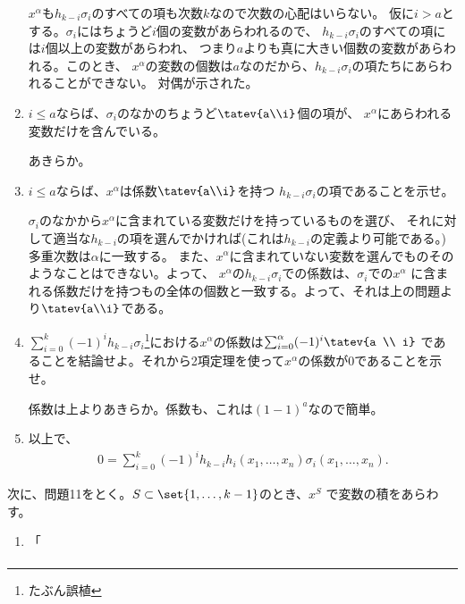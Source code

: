 \begin{myproof}
\begin{enumerate}[label=(\alph*)]
    $x^\alpha$も$h_{k-i}\sigma_i$のすべての項も次数$k$なので次数の心配はいらない。
    仮に$i>a$とする。$\sigma_i$にはちょうど$i$個の変数があらわれるので、
    $h_{k-i}\sigma_i$のすべての項には$i$個以上の変数があらわれ、
    つまり$a$よりも真に大きい個数の変数があらわれる。このとき、
    $x^\alpha$の変数の個数は$a$なのだから、$h_{k-i}\sigma_i$の項たちにあらわれることができない。
    対偶が示された。
    \item
    \begin{framed}
      $i\le a$ならば、$\sigma_i$のなかのちょうど$\tatev{a\\i}$個の項が、
      $x^\alpha$にあらわれる変数だけを含んでいる。
    \end{framed}
    あきらか。
    \item
    \begin{framed}
      $i\le a$ならば、$x^\alpha$は係数$\tatev{a\\i}$を持つ
      $h_{k-i}\sigma_i$の項であることを示せ。
    \end{framed}
    $\sigma_i$のなかから$x^\alpha$に含まれている変数だけを持っているものを選び、
    それに対して適当な$h_{k-i}$の項を選んでかければ(これは$h_{k-i}$の定義より可能である。)多重次数は$\alpha$に一致する。
    また、$x^\alpha$に含まれていない変数を選んでものそのようなことはできない。よって、
    $x^\alpha$の$h_{k-i}\sigma_i$での係数は、$\sigma_i$での$x^\alpha$
    に含まれる係数だけを持つもの全体の個数と一致する。よって、それは上の問題より$\tatev{a\\i}$である。
    \item
    \begin{framed}
      $\sum_{i=0}^k (-1)^i h_{k-i}\sigma_i$\footnote{たぶん誤植}における$x^\alpha$の係数は$\sum_{i=0}^\alpha (-1)^i \tatev{a \\ i}$
      であることを結論せよ。それから2項定理を使って$x^\alpha$の係数が0であることを示せ。
    \end{framed}
    係数は上よりあきらか。係数も、これは$(1-1)^a$なので簡単。
    \item
    以上で、
    \begin{align}
      0=\sum_{i=0}^k (-1)^i h_{k-i}h_i(x_1,\dots,x_n) \sigma_i(x_1,\dots,x_n).
    \end{align}
  \end{enumerate}
  次に、問題11をとく。$S\subset \set{1,\dots,k-1}$のとき、$x^S$
  で変数の積をあらわす。
  \begin{enumerate}[label=(\alph*)]
    \item
    「
      \begin{align}

\end{align}
\end{enumerate}
\end{myproof}
